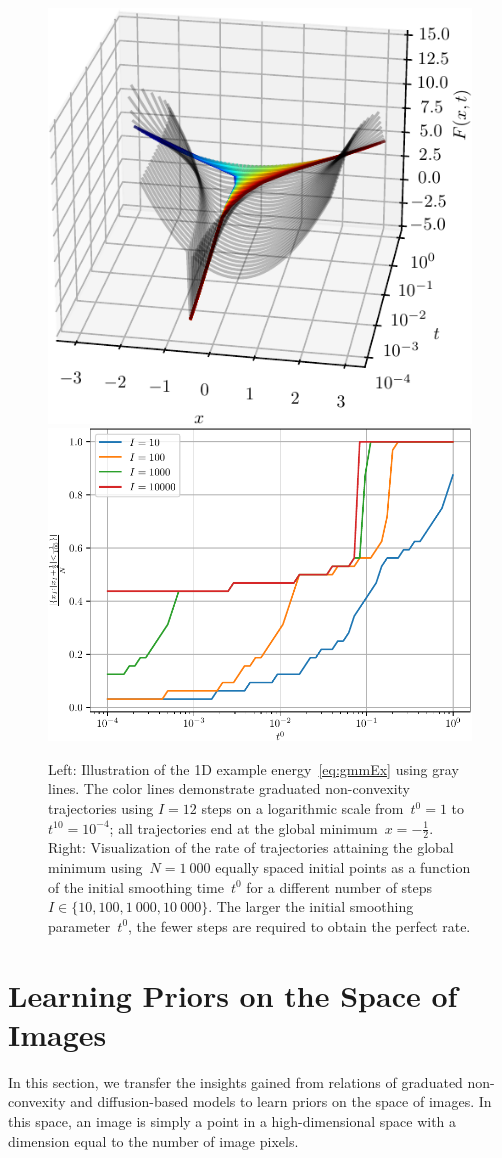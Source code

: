 \documentclass{article} %
\theoremstyle{plain}
\theoremstyle{definition}
\theoremstyle{remark}
\begin{document}
\begin{figure}[t]
\includegraphics[width=.45\linewidth]{figures/ex_gmm/ex_gmm_opt}\hfill
\includegraphics[width=.54\linewidth]{figures/ex_gmm/ex_gmm_acc}
\label{fig:gmmOptimization}
\caption{Left: Illustration of the 1D example energy~\eqref{eq:gmmEx} using gray lines. The color lines demonstrate graduated non-convexity trajectories using $I=12$ steps on a logarithmic scale from~$t^0=1$ to $t^{10}=10^{-4}$; all trajectories end at the global minimum~$x=-\frac12$.
Right: Visualization of the rate of trajectories attaining the global minimum using~$N=1\ 000$ equally spaced initial points as a function of the initial smoothing time~$t^0$ for a different number of steps~$I\in\{10,100,1\ 000,10\ 000\}$.
The larger the initial smoothing parameter~$t^0$, the fewer steps are required to obtain the perfect rate.
}
\end{figure}

\section{Learning Priors on the Space of Images}
In this section, we transfer the insights gained from relations of graduated non-convexity and diffusion-based models to learn priors on the space of images.
In this space, an image is simply a point in a high-dimensional space with a dimension equal to the number of image pixels.
\end{document}
